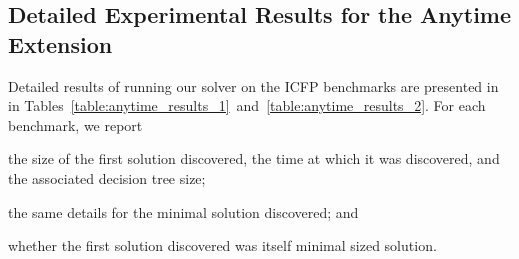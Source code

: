 \newpage
\renewcommand{\thesection}{\appendixname~\Alph{section}}
\begin{appendices}
\section{Detailed Experimental Results for the Anytime Extension}
\label{section:appendix_experimental_results}


% 

\vspace*{-1ex}
Detailed results of running our solver on the ICFP benchmarks are
presented in in
Tables~\ref{table:anytime_results_1}~and~\ref{table:anytime_results_2}. For
each benchmark,
we report
\begin{inparaenum}[(a)]
\item the size of the first solution discovered, the time at which it
was discovered, and the associated decision tree size;
\item the same details for the minimal solution discovered; and
\item whether the first solution discovered was itself minimal sized
  solution.
\end{inparaenum}



\end{appendices}
